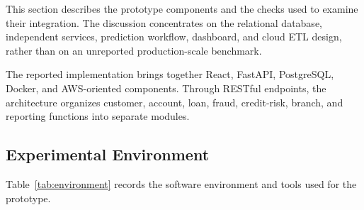 \documentclass[conference]{IEEEtran}
\begin{document}
This section describes the prototype components and the checks used to examine their integration. The discussion concentrates on the relational database, independent services, prediction workflow, dashboard, and cloud ETL design, rather than on an unreported production-scale benchmark.

The reported implementation brings together React, FastAPI, PostgreSQL, Docker, and AWS-oriented components. Through RESTful endpoints, the architecture organizes customer, account, loan, fraud, credit-risk, branch, and reporting functions into separate modules.

\subsection{Experimental Environment}

Table~\ref{tab:environment} records the software environment and tools used for the prototype.
\end{document}
